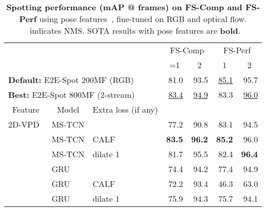 \documentclass[runningheads]{llncs}
\newcommand{\OURMETHOD}{{E2E-Spot}\xspace}
\newcommand{\fscomp}{{FS-Comp}\xspace}
\newcommand{\fsperf}{{FS-Perf}\xspace}
\newcommand{\best}[1]{\underline{#1}}
\newcommand{\sota}[1]{\textbf{#1}}
\newcommand{\nms}{\textsuperscript{\textdagger}}
\begin{document}
\renewcommand{\tabcolsep}{0.2cm}
\begin{table}[tp]
    \centering
    \caption{{\bf Spotting performance (mAP @  frames) on \fscomp and \fsperf} using pose features~\cite{vpd}, fine-tuned on RGB and optical flow.
    \textdagger~indicates NMS.
    SOTA results with pose features are \sota{bold}.}
    \label{tab:supp_full_result_pose}
    \vspace{0.5em}
    {
    \scriptsize
    \begin{tabularx}{0.87\textwidth}{lll
        rr
        rr
    }
        \toprule
        &&
            & \multicolumn{2}{c}{\fscomp}
            & \multicolumn{2}{c}{\fsperf}
            \\
        &&
            & \multicolumn{1}{c}{=1}
            & \multicolumn{1}{c}{2}
            & \multicolumn{1}{c}{1}
            & \multicolumn{1}{c}{2}
            \\
        \midrule

        \multicolumn{3}{l}{{\bf Default:} \OURMETHOD 200MF (RGB)}
            & \nms 81.0 & \nms 93.5 & \nms \best{85.1} & \nms 95.7 \\
        \multicolumn{3}{l}{{\bf Best:} \OURMETHOD 800MF (2-stream)}
            & \nms \best{83.4} & \nms \best{94.9} & \nms 83.3 & \nms \best{96.0} \\

        \midrule
        \multicolumn{1}{c}{Feature}
            & \multicolumn{1}{c}{Model}
            & \multicolumn{1}{c}{Extra loss (if any)}
            \\

        \midrule
        2D-VPD~\cite{vpd}
        & MS-TCN &
            & 77.2 & \nms 90.8 & 83.1 & \nms 94.5 \\

        & MS-TCN & CALF
            & \sota{83.5} & \nms \sota{96.2} & \sota{85.2} & \nms 96.0 \\

        & MS-TCN & dilate 1
            & 81.7 & \nms 95.5 & 82.4 & \nms \sota{96.4} \\

        \cmidrule{2-7}
        & GRU &
            & \nms 74.4 & \nms 94.2 & \nms 77.4 & \nms 94.9 \\

        & GRU & CALF
            & \nms 72.2 & \nms 93.4 & \nms 46.3 & \nms 63.0 \\

        & GRU & dilate 1
            & \nms 75.9 & \nms 94.3 & \nms 75.7 & \nms 94.1 \\


\end{tabularx}}
\end{table}
\end{document}
